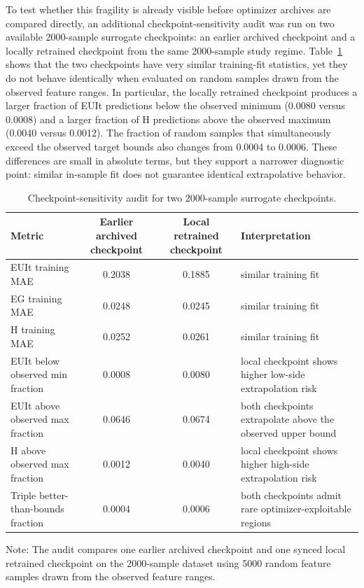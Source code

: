 To test whether this fragility is already visible before optimizer archives are compared directly, an additional checkpoint-sensitivity audit was run on two available 2000-sample surrogate checkpoints: an earlier archived checkpoint and a locally retrained checkpoint from the same 2000-sample study regime. Table~\ref{tab:supp_checkpoint} shows that the two checkpoints have very similar training-fit statistics, yet they do not behave identically when evaluated on random samples drawn from the observed feature ranges. In particular, the locally retrained checkpoint produces a larger fraction of EUIt predictions below the observed minimum (0.0080 versus 0.0008) and a larger fraction of H predictions above the observed maximum (0.0040 versus 0.0012). The fraction of random samples that simultaneously exceed the observed target bounds also changes from 0.0004 to 0.0006. These differences are small in absolute terms, but they support a narrower diagnostic point: similar in-sample fit does not guarantee identical extrapolative behavior.

\begin{table}[H]
\centering
\caption{Checkpoint-sensitivity audit for two 2000-sample surrogate checkpoints.}
\label{tab:supp_checkpoint}
\begin{threeparttable}
\footnotesize
\begin{tabularx}{\linewidth}{@{}lccX@{}}
\toprule
Metric & Earlier archived checkpoint & Local retrained checkpoint & Interpretation \\
\midrule
EUIt training MAE & 0.2038 & 0.1885 & similar training fit \\
EG training MAE & 0.0248 & 0.0245 & similar training fit \\
H training MAE & 0.0252 & 0.0261 & similar training fit \\
EUIt below observed min fraction & 0.0008 & 0.0080 & local checkpoint shows higher low-side extrapolation risk \\
EUIt above observed max fraction & 0.0646 & 0.0674 & both checkpoints extrapolate above the observed upper bound \\
H above observed max fraction & 0.0012 & 0.0040 & local checkpoint shows higher high-side extrapolation risk \\
Triple better-than-bounds fraction & 0.0004 & 0.0006 & both checkpoints admit rare optimizer-exploitable regions \\
\bottomrule
\end{tabularx}
\begin{tablenotes}[flushleft]
\footnotesize
\item Note: The audit compares one earlier archived checkpoint and one synced local retrained checkpoint on the 2000-sample dataset using 5000 random feature samples drawn from the observed feature ranges.
\end{tablenotes}
\end{threeparttable}
\end{table}

